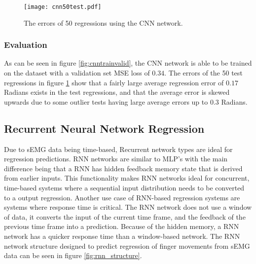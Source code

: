 \documentclass[../main.tex]{subfiles}
\begin{document}
\begin{figure}[H]
\begin{center}
\texttt{[image: cnn50test.pdf]}
\caption{The errors of 50 regressions using the CNN network.}
\label{fig:cnntest}
\end{center}
\end{figure}


\subsubsection{Evaluation}

As can be seen in figure \ref{fig:cnntrainvalid}, the CNN network is able to be trained on the dataset with a validation set MSE loss of $0.34$.
The errors of the 50 test regressions in figure \ref{fig:cnntest} show that a fairly large average regression error of $0.17$ Radians exists in the test regressions, and that the average error is skewed upwards due to some outlier tests having large average errors up to $0.3$ Radians.



\subsection{Recurrent Neural Network Regression}

Due to sEMG data being time-based, Recurrent network types are ideal for regression predictions.
RNN networks are similar to MLP's with the main difference being that a RNN has hidden feedback  memory state that is derived from earlier inputs.
This functionality makes RNN networks ideal for concurrent, time-based systems where a sequential input distribution needs to be converted to a output regression.  
Another use case of RNN-based regression systems are systems where response time is critical.
The RNN network does not use a window of data, it converts the input of the current time frame, and the feedback of the previous time frame into a prediction.
Because of the hidden memory, a RNN network has a quicker response time than a window-based network.
The RNN network structure designed to predict regression of finger movements from sEMG data can be seen in figure \ref{fig:rnn_structure}.
\end{document}
